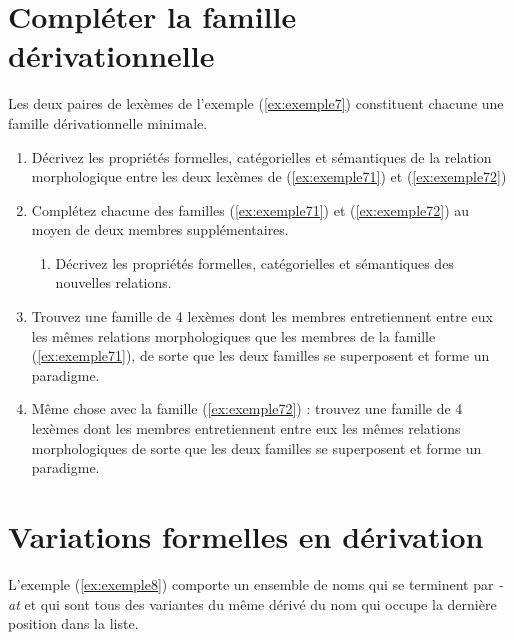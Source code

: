 \section{Compléter la famille dérivationnelle}

Les deux paires de lexèmes de l'exemple (\ref{ex:exemple7})  constituent chacune une famille dérivationnelle minimale. 

\begin{exe}
  \ex \label{ex:exemple7}
  \begin{xlist}
    \ex \label{ex:exemple71} \applicateurexsept
    \ex \label{ex:exemple72} \contestataireexsept
  \end{xlist}
\end{exe}

\begin{enumerate}
\item Décrivez les propriétés formelles, catégorielles et sémantiques de la relation morphologique entre les deux lexèmes de (\ref{ex:exemple71}) et (\ref{ex:exemple72}) 
\item Complétez chacune des familles (\ref{ex:exemple71}) et (\ref{ex:exemple72})  au moyen de deux membres supplémentaires.
  \begin{enumerate}
  \item Décrivez les propriétés formelles, catégorielles et sémantiques des nouvelles relations.
  \end{enumerate}
\item Trouvez une famille de 4 lexèmes dont les membres entretiennent entre eux les mêmes relations morphologiques que les membres de la famille  (\ref{ex:exemple71}), de sorte que les deux familles se superposent et forme un paradigme.
\item Même chose avec la famille  (\ref{ex:exemple72}) : trouvez une famille de 4 lexèmes dont les membres entretiennent entre eux les mêmes relations morphologiques de sorte que les deux familles se superposent et forme un paradigme.
\end{enumerate}

\section{Variations formelles en dérivation}

L'exemple (\ref{ex:exemple8})  comporte un ensemble de noms qui se terminent par \emph{-at} et qui sont tous des variantes du même dérivé du  nom qui occupe la dernière position dans la liste. 

